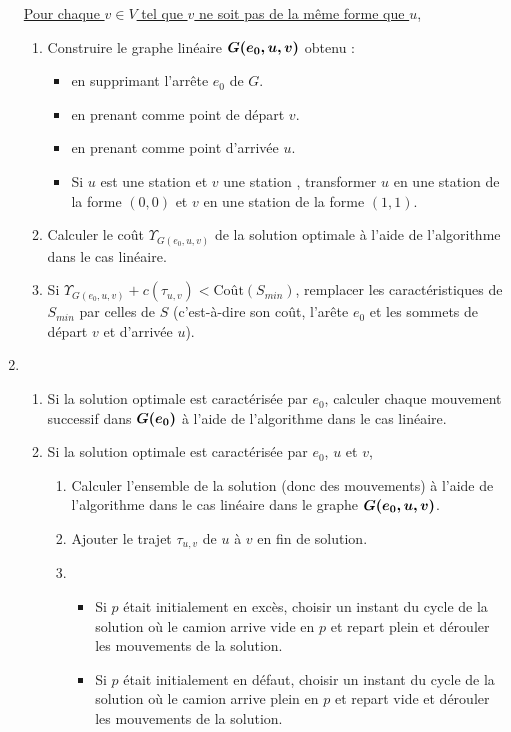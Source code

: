 \begin{enumerate}
  \uline{Pour chaque $v \in V$ tel que $v$ ne soit pas de la même forme que $u$},
  \begin{enumerate}
  \item Construire le graphe linéaire $\boldsymbol{G(e_0,u,v)}$ obtenu :
    \begin{itemize}
    \item en supprimant l'arrête $e_0$ de $G$.
    \item en prenant comme point de départ $v$.
    \item en prenant comme point d'arrivée $u$.
    \item Si $u$ est une station \plus et $v$ une station \moins, transformer $u$ en une station de la forme $(0,0)$ et $v$ en une station de la forme $(1,1)$.
    \end{itemize}
  \item Calculer le coût $\Upsilon_{G(e_0,u,v)}$ de la solution optimale à l'aide de l'algorithme dans le cas linéaire.
  \item Si $\Upsilon_{G(e_0,u,v)} + c(\tau_{u,v}) < \mbox{Coût}(S_{min})$, remplacer les caractéristiques de $S_{min}$ par celles de $S$ (c'est-à-dire son coût, l'arête $e_0$ et les sommets de départ $v$ et d'arrivée $u$).
  \end{enumerate}
\item \begin{enumerate}
\item Si la solution optimale est caractérisée par $e_0$, calculer chaque mouvement successif dans $\boldsymbol{G(e_0)}$ à l'aide de l'algorithme dans le cas linéaire.
  \item Si la solution optimale est caractérisée par $e_0$, $u$ et $v$, 
    \begin{enumerate}
    \item Calculer l'ensemble de la solution (donc des mouvements) à l'aide de l'algorithme dans le cas linéaire dans le graphe $\boldsymbol{G(e_0,u,v)}$.
    \item Ajouter le trajet $\tau_{u,v}$ de $u$ à $v$ en fin de solution.
    \item \begin{itemize}
      \item Si $p$ était initialement en excès, choisir un instant du cycle de la solution où le camion arrive vide en $p$ et repart plein et dérouler les mouvements de la solution.
      \item Si $p$ était initialement en défaut, choisir un instant du cycle de la solution où le camion arrive plein en $p$ et repart vide et dérouler les mouvements de la solution.
      \end{itemize}
    \end{enumerate}
  \end{enumerate}
\end{enumerate}


